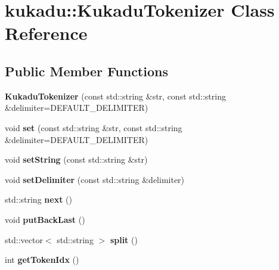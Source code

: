 \hypertarget{classkukadu_1_1KukaduTokenizer}{}\section{kukadu\+:\+:Kukadu\+Tokenizer Class Reference}
\label{classkukadu_1_1KukaduTokenizer}
\subsection*{Public Member Functions}
\begin{DoxyCompactItemize}
\item 
{\bfseries Kukadu\+Tokenizer} (const std\+::string \&str, const std\+::string \&delimiter=D\+E\+F\+A\+U\+L\+T\+\_\+\+D\+E\+L\+I\+M\+I\+T\+ER)\hypertarget{classkukadu_1_1KukaduTokenizer_aae8ae3c9b1fa4cf3b2e1d7aacce89042}{}\label{classkukadu_1_1KukaduTokenizer_aae8ae3c9b1fa4cf3b2e1d7aacce89042}

\item 
void {\bfseries set} (const std\+::string \&str, const std\+::string \&delimiter=D\+E\+F\+A\+U\+L\+T\+\_\+\+D\+E\+L\+I\+M\+I\+T\+ER)\hypertarget{classkukadu_1_1KukaduTokenizer_a0bf607b688bdb8a21371335ac4415a1e}{}\label{classkukadu_1_1KukaduTokenizer_a0bf607b688bdb8a21371335ac4415a1e}

\item 
void {\bfseries set\+String} (const std\+::string \&str)\hypertarget{classkukadu_1_1KukaduTokenizer_a0d3d6891c51dff67d9b9b367f9ffc930}{}\label{classkukadu_1_1KukaduTokenizer_a0d3d6891c51dff67d9b9b367f9ffc930}

\item 
void {\bfseries set\+Delimiter} (const std\+::string \&delimiter)\hypertarget{classkukadu_1_1KukaduTokenizer_a6ca4375a16e6be13c2b425345c324811}{}\label{classkukadu_1_1KukaduTokenizer_a6ca4375a16e6be13c2b425345c324811}

\item 
std\+::string {\bfseries next} ()\hypertarget{classkukadu_1_1KukaduTokenizer_a1276cdd662e68254f9f7f277e534603d}{}\label{classkukadu_1_1KukaduTokenizer_a1276cdd662e68254f9f7f277e534603d}

\item 
void {\bfseries put\+Back\+Last} ()\hypertarget{classkukadu_1_1KukaduTokenizer_ac432b19d37cd0ee3baf73d7ee350cf55}{}\label{classkukadu_1_1KukaduTokenizer_ac432b19d37cd0ee3baf73d7ee350cf55}

\item 
std\+::vector$<$ std\+::string $>$ {\bfseries split} ()\hypertarget{classkukadu_1_1KukaduTokenizer_a8fa96ce320c74d7b350546c28bc18d12}{}\label{classkukadu_1_1KukaduTokenizer_a8fa96ce320c74d7b350546c28bc18d12}

\item 
int {\bfseries get\+Token\+Idx} ()\hypertarget{classkukadu_1_1KukaduTokenizer_a4d9ef340611b923b365394ee314f05b3}{}\label{classkukadu_1_1KukaduTokenizer_a4d9ef340611b923b365394ee314f05b3}

\end{DoxyCompactItemize}


